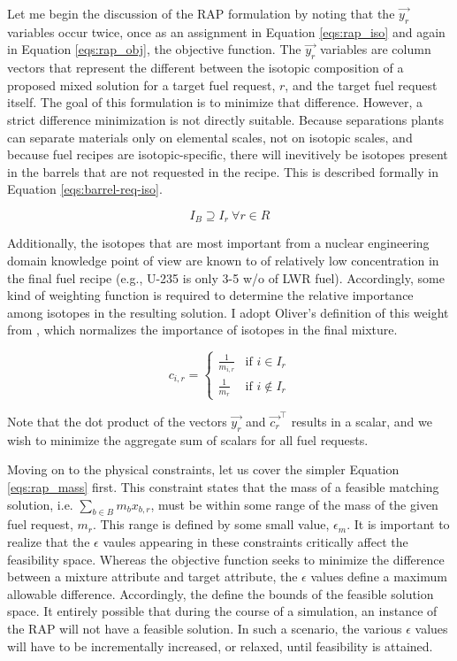 Let me begin the discussion of the RAP formulation by noting that the
$\vec{y_{r}}$ variables occur twice, once as an assignment in
Equation \ref{eqs:rap_iso} and again in Equation \ref{eqs:rap_obj}, the
objective function. The $\vec{y_{r}}$ variables are column vectors that
represent the different between the isotopic composition of a proposed mixed
solution for a target fuel request, $r$, and the target fuel request itself. The
goal of this formulation is to minimize that difference. However, a strict
difference minimization is not directly suitable. Because separations plants can
separate materials only on elemental scales, not on isotopic scales, and because
fuel recipes are isotopic-specific, there will inevitively be isotopes present
in the barrels that are not requested in the recipe. This is described formally
in Equation \ref{eqs:barrel-req-iso}.

\begin{equation}
\label{eqs:barrel-req-iso}
I_{B} \supseteq I_{r} \: \forall r \in R
\end{equation}

Additionally, the isotopes that are most important from a nuclear engineering
domain knowledge point of view are known to of relatively low concentration in
the final fuel recipe (e.g., U-235 is only 3-5 w/o of LWR fuel). Accordingly,
some kind of weighting function is required to determine the relative importance
among isotopes in the resulting solution. I adopt Oliver's definition of this
weight from \cite{oliver_geniusv2:_2009}, which normalizes the importance of
isotopes in the final mixture.

\begin{equation}
c_{i,r} = 
\begin{cases}
 \frac{1}{m_{i,r}} & \text{if } i \in I_{r} \\
 \frac{1}{m_{r}}   & \text{if } i \not\in I_{r}
\end{cases}
\end{equation}

Note that the dot product of the vectors $\vec{y_{r}}$ and $\vec{c_{r}}^{\top}$
results in a scalar, and we wish to minimize the aggregate sum of scalars for
all fuel requests.

Moving on to the physical constraints, let us cover the simpler
Equation \ref{eqs:rap_mass} first. This constraint states that the mass of a
feasible matching solution, i.e. $\sum_{b \in B} m_{b} x_{b,r}$, must be within
some range of the mass of the given fuel request, $m_{r}$. This range is defined
by some small value, $\epsilon_{m}$. It is important to realize that the
$\epsilon$ vaules appearing in these constraints critically affect the
feasibility space. Whereas the objective function seeks to minimize the
difference between a mixture attribute and target attribute, the $\epsilon$
values define a maximum allowable difference. Accordingly, the define the bounds
of the feasible solution space. It entirely possible that during the course of a
simulation, an instance of the RAP will not have a feasible solution. In such a
scenario, the various $\epsilon$ values will have to be incrementally increased,
or relaxed, until feasibility is attained.

